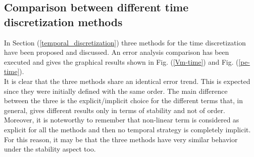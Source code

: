 \documentclass[a4paper,11pt]{article}
\begin{document}
\subsection{Comparison between different time discretization methods}
In Section (\ref{temporal_discretization}) three methods for the time discretization have been proposed and discussed. An error analysis comparison has been executed and gives the graphical results shown in Fig. (\ref{Vm-time}) and Fig. (\ref{pe-time}). \\
\noindent It is clear that the three methods share an identical error trend. This is expected since they were initially defined with the same order. The main difference between the three is the explicit/implicit choice for the different terms that, in general, gives different results only in terms of stability and not of order. Moreover, it is noteworthy to remember that non-linear term is considered as explicit for all the methods and then no temporal strategy is completely implicit. For this reason, it may be that the three methods have very similar behavior under the stability aspect too.
\end{document}
